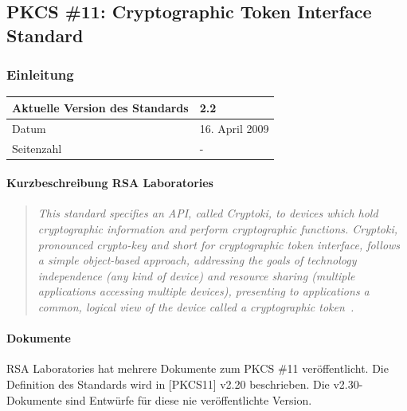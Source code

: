 \documentclass[10pt,a4paper]{article}
\begin{document}
\subsection{PKCS \#11: Cryptographic Token Interface Standard}

\subsubsection{Einleitung}
\begin{table}[ht]
    \centering
    \begin{tabular}{|l|p{7.2cm}|} \hline
        Aktuelle Version des Standards & 2.2 \\\hline
        Datum & 16. April 2009 \\\hline
        Seitenzahl & - \\\hline
    \end{tabular}
\end{table}

\paragraph{Kurzbeschreibung RSA Laboratories}
\begin{quotation}
    \itshape This standard specifies an API, called Cryptoki, to devices which hold
    cryptographic information and perform cryptographic functions. Cryptoki, pronounced
    crypto-key and short for cryptographic token interface, follows a simple object-based
    approach, addressing the goals of technology independence (any kind of device) and
    resource sharing (multiple applications accessing multiple devices), presenting to
    applications a common, logical view of the device called a cryptographic
    token~\cite{pkcs11}.
\end{quotation}

\paragraph{Dokumente}
RSA Laboratories hat mehrere Dokumente zum PKCS \#11 veröffentlicht. Die Definition des
Standards wird in [PKCS11] v2.20 beschrieben. Die v2.30-Dokumente sind Entwürfe für diese
nie veröffentlichte Version.
\end{document}
